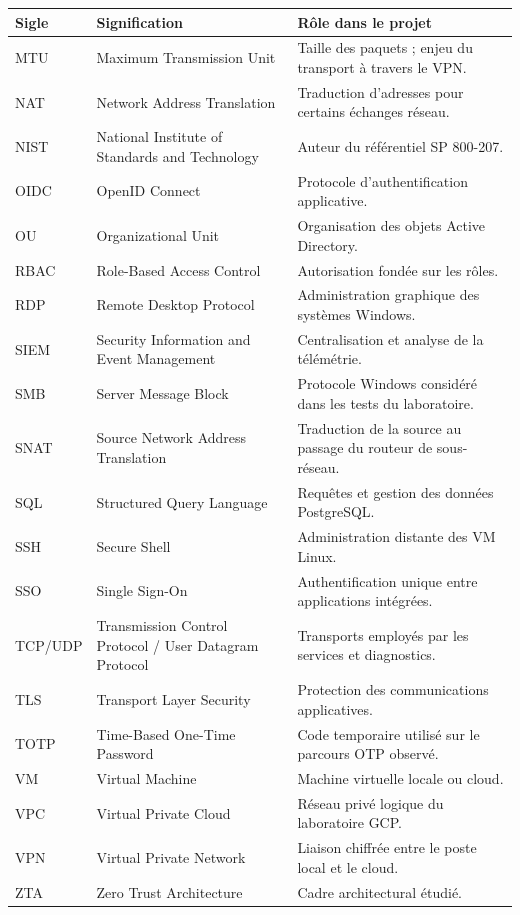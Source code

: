 \documentclass[a4paper,12pt]{report}
\begin{document}
\noindent\begin{tabularx}{\textwidth}{@{}p{2cm}p{5.6cm}Y@{}}
\toprule\textbf{Sigle} & \textbf{Signification} & \textbf{Rôle dans le projet}\\\midrule
MTU & Maximum Transmission Unit & Taille des paquets ; enjeu du transport à travers le VPN.\\
NAT & Network Address Translation & Traduction d'adresses pour certains échanges réseau.\\
NIST & National Institute of Standards and Technology & Auteur du référentiel SP 800-207.\\
OIDC & OpenID Connect & Protocole d'authentification applicative.\\
OU & Organizational Unit & Organisation des objets Active Directory.\\
RBAC & Role-Based Access Control & Autorisation fondée sur les rôles.\\
RDP & Remote Desktop Protocol & Administration graphique des systèmes Windows.\\
SIEM & Security Information and Event Management & Centralisation et analyse de la télémétrie.\\
SMB & Server Message Block & Protocole Windows considéré dans les tests du laboratoire.\\
SNAT & Source Network Address Translation & Traduction de la source au passage du routeur de sous-réseau.\\
SQL & Structured Query Language & Requêtes et gestion des données PostgreSQL.\\
SSH & Secure Shell & Administration distante des VM Linux.\\
SSO & Single Sign-On & Authentification unique entre applications intégrées.\\
TCP/UDP & Transmission Control Protocol / User Datagram Protocol & Transports employés par les services et diagnostics.\\
TLS & Transport Layer Security & Protection des communications applicatives.\\
TOTP & Time-Based One-Time Password & Code temporaire utilisé sur le parcours OTP observé.\\
VM & Virtual Machine & Machine virtuelle locale ou cloud.\\
VPC & Virtual Private Cloud & Réseau privé logique du laboratoire GCP.\\
VPN & Virtual Private Network & Liaison chiffrée entre le poste local et le cloud.\\
ZTA & Zero Trust Architecture & Cadre architectural étudié.\\
\bottomrule\end{tabularx}\endgroup
\clearpage{}
\end{document}
